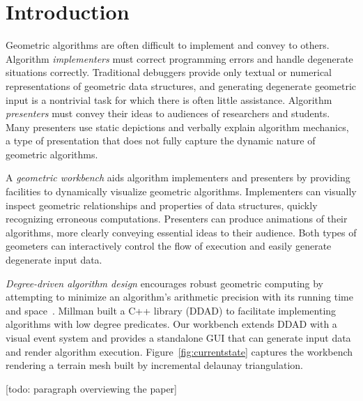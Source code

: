 \section{Introduction}

Geometric algorithms are often difficult to implement and convey to others.
Algorithm \emph{implementers} must correct programming errors and handle
degenerate situations correctly. Traditional debuggers provide only textual or
numerical representations of geometric data structures, and generating
degenerate geometric input is a nontrivial task for which there is often little
assistance. Algorithm \emph{presenters} must convey their ideas to audiences of
researchers and students. Many presenters use static depictions and verbally
explain algorithm mechanics, a type of presentation that does not fully capture
the dynamic nature of geometric algorithms.

A \emph{geometric workbench} aids algorithm implementers and presenters by
providing facilities to dynamically visualize geometric algorithms. Implementers
can visually inspect geometric relationships and properties of data structures,
quickly recognizing erroneous computations. Presenters can produce
animations of their algorithms, more clearly conveying essential
ideas to their audience. Both types of geometers can interactively control the
flow of execution and easily generate degenerate input data.


\emph{Degree-driven algorithm design} encourages robust geometric computing by
attempting to minimize an algorithm's arithmetic precision with its running time
and space~\cite{millman2012degree}. Millman built a C++ library (DDAD) to
facilitate implementing algorithms with low degree predicates. Our workbench
extends DDAD with a visual event system and provides a standalone GUI that can
generate input data and render algorithm execution.
Figure~\ref{fig:currentstate} captures the workbench rendering a terrain mesh
built by incremental delaunay triangulation.

[todo: paragraph overviewing the paper]

